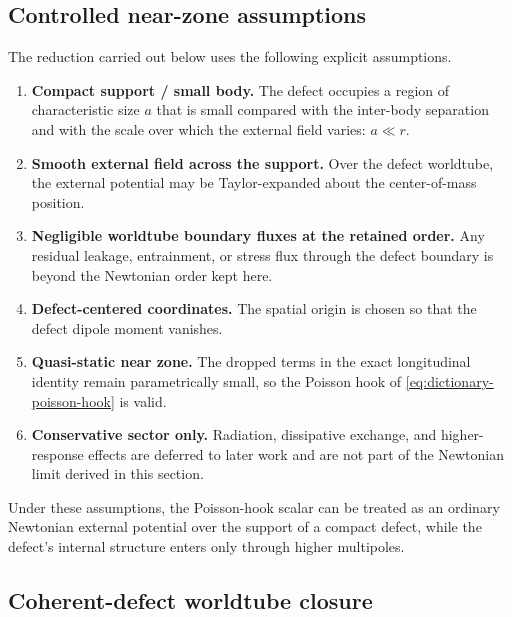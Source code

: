 \documentclass[11pt]{article}
\begin{document}
\subsection{Controlled near-zone assumptions}
\label{sec:near-zone-assumptions}

The reduction carried out below uses the following explicit assumptions.
\begin{enumerate}[leftmargin=1.5em]
  \item \textbf{Compact support / small body.}
  The defect occupies a region of characteristic size \(a\) that is small compared with
  the inter-body separation and with the scale over which the external field varies:
  \(a\ll r\).

  \item \textbf{Smooth external field across the support.}
  Over the defect worldtube, the external potential may be Taylor-expanded about the
  center-of-mass position.

  \item \textbf{Negligible worldtube boundary fluxes at the retained order.}
  Any residual leakage, entrainment, or stress flux through the defect boundary is beyond
  the Newtonian order kept here.

  \item \textbf{Defect-centered coordinates.}
  The spatial origin is chosen so that the defect dipole moment vanishes.

  \item \textbf{Quasi-static near zone.}
  The dropped terms in the exact longitudinal identity remain parametrically small, so
  the Poisson hook of \cref{eq:dictionary-poisson-hook} is valid.

  \item \textbf{Conservative sector only.}
  Radiation, dissipative exchange, and higher-response effects are deferred to later
  work and are not part of the Newtonian limit derived in this section.
\end{enumerate}

Under these assumptions, the Poisson-hook scalar can be treated as an ordinary Newtonian
external potential over the support of a compact defect, while the defect's internal
structure enters only through higher multipoles.

\subsection{Coherent-defect worldtube closure}
\label{sec:coherent-defect}
\end{document}
